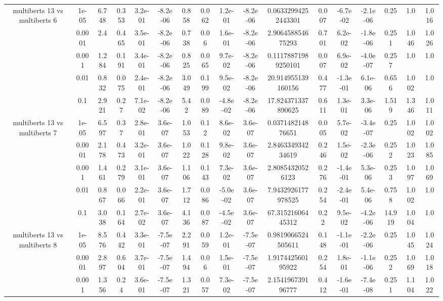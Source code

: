 \begin{tabular}{|c|c|c|c|c|c|c|c|c|c|c|c|c|c|c|c|c|}
\hline
\multirow{5}{*}{multiberts 13 vs multiberts 6} & 1e-05 & 6.748 & 0.353 & 3.2e-01 & -8.2e-06 & 0.858 & 0.062 & 1.2e-01 & -8.2e-06 & 0.06332994252443301 & 0.007 & -6.7e-02 & -2.1e-06 & 0.25 & 1.0 & 1.016 \\
 & 0.0001 & 2.4 & 0.465 & 3.5e-01 & -8.2e-06 & 0.738 & 0.06 & 1.6e-01 & -8.2e-06 & 2.906458854675293 & 0.701 & 6.2e-02 & -1.8e-06 & 0.251 & 1.046 & 1.026 \\
 & 0.001 & 1.284 & 0.191 & 3.4e-01 & -8.2e-06 & 0.825 & 0.065 & 9.7e-02 & -8.2e-06 & 0.11178871989250101 & 0.007 & 6.9e-02 & -4.0e-07 & 0.257 & 1.0 & 1.0 \\
 & 0.01 & 0.832 & 0.075 & 2.4e-01 & -8.2e-06 & 3.049 & 0.199 & 9.5e-02 & -8.2e-06 & 20.914955139160156 & 0.477 & -1.3e-01 & 6.1e-06 & 0.656 & 1.002 & 1.0 \\
 & 0.1 & 2.921 & 0.27 & 7.1e-02 & -8.2e-06 & 5.42 & 0.089 & -4.8e-02 & -8.2e-06 & 17.824371337890625 & 0.611 & 1.3e-01 & 3.3e-06 & 1.519 & 1.346 & 1.011 \\
\hline
\multirow{5}{*}{multiberts 13 vs multiberts 7} & 1e-05 & 6.597 & 0.37 & 2.8e-01 & 3.6e-07 & 1.053 & 0.12 & 8.6e-02 & 3.6e-07 & 0.037148214876651 & 0.005 & 5.7e-02 & -3.4e-07 & 0.25 & 1.002 & 1.002 \\
 & 0.0001 & 2.178 & 0.473 & 3.2e-01 & 3.6e-07 & 1.022 & 0.128 & 9.8e-02 & 3.6e-07 & 2.846334934234619 & 0.246 & 1.5e-02 & -2.3e-06 & 0.252 & 1.023 & 1.085 \\
 & 0.001 & 1.461 & 0.279 & 3.1e-01 & 3.6e-07 & 1.106 & 0.143 & 7.3e-02 & 3.6e-07 & 2.80854320526123 & 0.276 & -1.4e-01 & 5.3e-06 & 0.253 & 1.097 & 1.069 \\
 & 0.01 & 0.867 & 0.066 & 2.2e-01 & 3.6e-07 & 1.712 & 0.086 & -5.0e-02 & 3.6e-07 & 7.9432926177978525 & 0.254 & -2.4e-01 & 5.4e-06 & 0.758 & 1.002 & 1.0 \\
 & 0.1 & 3.038 & 0.164 & 2.7e-02 & 3.6e-07 & 4.136 & 0.087 & -4.5e-02 & 3.6e-07 & 67.31521606445312 & 0.22 & 9.5e-02 & -4.2e-06 & 14.919 & 1.004 & 1.0 \\
\hline
\multirow{5}{*}{multiberts 13 vs multiberts 8} & 1e-05 & 8.576 & 0.442 & 3.3e-01 & -7.5e-07 & 2.291 & 0.059 & 1.2e-01 & -7.5e-07 & 0.9819066524505611 & 0.148 & -1.1e-01 & -2.2e-06 & 0.25 & 1.045 & 1.024 \\
 & 0.0001 & 2.897 & 0.604 & 3.7e-01 & -7.5e-07 & 1.494 & 0.06 & 1.5e-01 & -7.5e-07 & 1.917442560195922 & 0.254 & 1.8e-01 & -1.1e-06 & 0.252 & 1.069 & 1.018 \\
 & 0.001 & 1.356 & 0.24 & 3.6e-01 & -7.5e-07 & 1.321 & 0.057 & 7.3e-02 & -7.5e-07 & 2.154196739196777 & 0.412 & -1.6e-01 & -7.4e-08 & 0.251 & 1.104 & 1.022 \\

\end{tabular}
